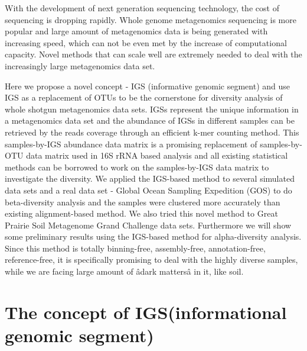 With the development of next generation sequencing technology, the cost of sequencing is dropping rapidly. 
Whole genome metagenomics sequencing is more popular and large amount of metagenomics data is 
being generated with increasing speed, which can not be even met by the increase of computational capacity.
Novel methods that can scale well are extremely needed to deal with the increasingly large metagenomics data
set. 


%
%
%
%
%
%
%
%
%
%
%
%
%
%
%
%
%
%
%
%
%
%


Here we propose a novel concept - IGS (informative genomic 
segment) and use IGS as a replacement of OTUs to be the cornerstone for 
diversity analysis of whole shotgun metagenomics data sets. IGSs represent the 
unique information in a metagenomics data set and the abundance of IGSs in 
different samples can be retrieved by the reads coverage through an efficient 
k-mer counting method. This samples-by-IGS abundance data matrix is a promising
replacement of samples-by-OTU data matrix used in 16S rRNA based analysis and 
all existing statistical methods can be borrowed to work on the samples-by-IGS 
data matrix to investigate the diversity. We applied the IGS-based method to 
several simulated data sets and a real data set - Global Ocean Sampling 
Expedition (GOS) to do beta-diversity analysis and the samples were clustered 
more accurately than existing alignment-based method. We also tried this novel 
method to Great Prairie Soil Metagenome Grand Challenge data sets. Furthermore 
we will show some preliminary results using the IGS-based method for 
alpha-diversity analysis. Since this method is totally binning-free, 
assembly-free, annotation-free, reference-free, it is specifically promising 
to deal with the highly diverse samples, while we are facing large amount of 
âdark mattersâ in it, like soil.




\section{The concept of IGS(informational genomic segment)}

